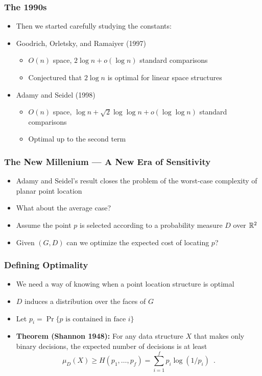 \documentclass{beamer}
\begin{document}
\frame
{
  \frametitle{The 1990s}
  \begin{itemize}
  \item<1-> Then we started carefully studying the constants:
   \item<2-> Goodrich, Orletsky, and Ramaiyer (1997)
   \begin{itemize}
      \item<3-> $O(n)$ space, $2\log n + o(\log n)$ standard comparisons
      \item<4-> Conjectured that $2\log n$ is optimal for linear space structures
   \end{itemize}
   \item<5-> Adamy and Seidel (1998)
   \begin{itemize}
      \item<6-> $O(n)$ space, $\log n + \sqrt{2}\log\log n +
o(\log\log n)$ standard comparisons
      \item<7-> Optimal up to the second term
   \end{itemize}
  \end{itemize}
}

\frame
{
  \frametitle{The New Millenium --- A New Era of Sensitivity}
  \begin{itemize}
  \item<1-> Adamy and Seidel's result closes the problem of the
	worst-case complexity of planar point location
  \item<2-> What about the average case?
  \item<3-> Assume the point $p$ is selected according to a
	probability measure $D$ over $\mathbb{R}^2$
  \item<4-> Given $(G,D)$ can we optimize the expected cost of
	locating $p$?
  \end{itemize}
}

\frame
{
  \frametitle{Defining Optimality}
  \begin{itemize}
   \item<1-> We need a way of knowing when a point location structure
	is optimal
   \item<2-> $D$ induces a distribution over the faces of $G$
   \item<3-> Let $p_i=\Pr\{\mbox{$p$ is contained in face $i$}\}$
   \item<4-> \textbf{Theorem (Shannon 1948):}
     For any data structure $X$ that makes only binary decisions, the
expected number of decisions is at least
   \[
      \mu_D(X) \ge H(p_1,\ldots,p_f) = \sum_{i=1}^f p_i\log(1/p_i)  \enspace .
   \]
  \end{itemize}
}
\end{document}
